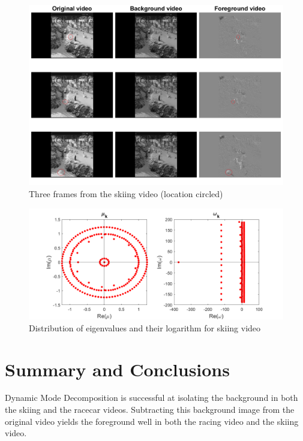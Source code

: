 \documentclass{article}
\begin{document}
\begin{figure}
	\centering
	\includegraphics[scale=0.8]{figs/ski_drop_result}
	\caption{Three frames from the skiing video (location circled)}
	\label{fig:fig4}
\end{figure}

\begin{figure}
	\centering
	\includegraphics[scale=0.7]{figs/ski_drop_eigen}
	\caption{Distribution of eigenvalues and their logarithm for skiing video}
	\label{fig:fig2}
\end{figure}


\section{Summary and Conclusions}

Dynamic Mode Decomposition is successful at isolating the background in both the skiing and the racecar videos. Subtracting this background image from the original video yields the foreground well in both the racing video and the skiing video. 
\end{document}
